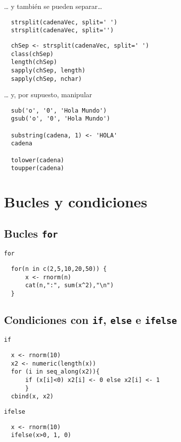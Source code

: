\documentclass[xcolor={usenames,svgnames,dvipsnames}]{beamer}
\begin{document}
\begin{frame}[fragile,label=sec-5-3-5]{\ldots{} y también se pueden separar\ldots{}}
 \lstset{language=R,label= ,caption= ,numbers=none}
\begin{lstlisting}
  strsplit(cadenaVec, split=' ')
  strsplit(cadenaVec, split='')
\end{lstlisting}

\lstset{language=R,label= ,caption= ,numbers=none}
\begin{lstlisting}
  chSep <- strsplit(cadenaVec, split=' ')
  class(chSep)
  length(chSep)
  sapply(chSep, length)
  sapply(chSep, nchar)
\end{lstlisting}
\end{frame}

\begin{frame}[fragile,label=sec-5-3-6]{\ldots{} y, por supuesto, manipular}
 \lstset{language=R,label= ,caption= ,numbers=none}
\begin{lstlisting}
  sub('o', '0', 'Hola Mundo')
  gsub('o', '0', 'Hola Mundo')
  
  substring(cadena, 1) <- 'HOLA'
  cadena
  
  tolower(cadena)
  toupper(cadena)
\end{lstlisting}
\end{frame}



\section{Bucles y condiciones}
\label{sec-6}
\subsection{Bucles \texttt{for}}
\label{sec-6-1}
\begin{frame}[fragile,label=sec-6-1-1]{\texttt{for}}
 \lstset{language=R,label= ,caption= ,numbers=none}
\begin{lstlisting}
  for(n in c(2,5,10,20,50)) {
      x <- rnorm(n)
      cat(n,":", sum(x^2),"\n")
  }
\end{lstlisting}
\end{frame}
\subsection{Condiciones con \texttt{if}, \texttt{else} e \texttt{ifelse}}
\label{sec-6-2}
\begin{frame}[fragile,label=sec-6-2-1]{\texttt{if}}
 \lstset{language=R,label= ,caption= ,numbers=none}
\begin{lstlisting}
  x <- rnorm(10)
  x2 <- numeric(length(x))
  for (i in seq_along(x2)){
      if (x[i]<0) x2[i] <- 0 else x2[i] <- 1
      }
  cbind(x, x2)
\end{lstlisting}
\end{frame}
\begin{frame}[fragile,label=sec-6-2-2]{\texttt{ifelse}}
 \lstset{language=R,label= ,caption= ,numbers=none}
\begin{lstlisting}
  x <- rnorm(10)
  ifelse(x>0, 1, 0)
\end{lstlisting}
\end{frame}
\end{document}

